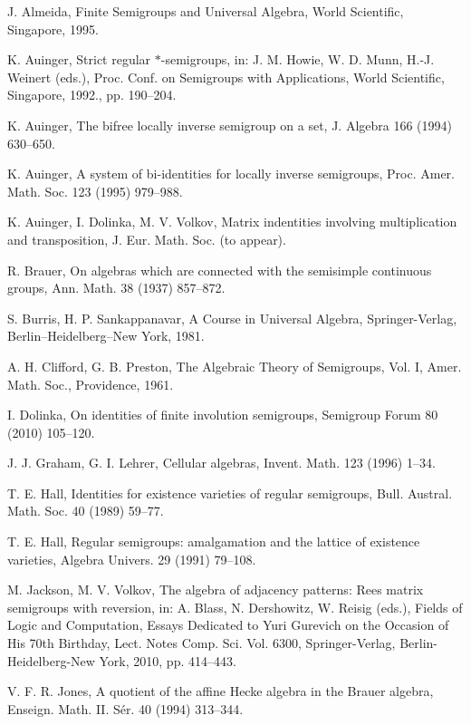 \documentclass[preprint,1p,times]{elsarticle}
\numberwithin{equation}{section}
\theoremstyle{remark}
\begin{document}
\begin{thebibliography}{99}
\frenchspacing

J. Almeida, Finite Semigroups and Universal Algebra, World Scientific, Singapore, 1995.

K. Auinger, Strict regular $*$-semigroups, in: J. M. Howie, W. D. Munn, H.-J. Weinert (eds.), Proc. Conf. on Semigroups
with Applications, World Scientific, Singapore, 1992., pp. 190--204.

K. Auinger, The bifree locally inverse semigroup on a set, J. Algebra 166 (1994) 630--650.

K. Auinger, A system of bi-identities for locally inverse semigroups, Proc. Amer. Math. Soc. 123 (1995) 979--988.

K. Auinger, I. Dolinka, M. V. Volkov, Matrix indentities involving multiplication and transposition, J. Eur. Math. Soc.
(to appear).

R. Brauer, On algebras which are connected with the semisimple continuous groups, Ann. Math. 38 (1937) 857--872.

S. Burris, H. P. Sankappanavar, A Course in Universal Algebra, Springer-Verlag, Berlin--Heidelberg--New York, 1981.

A. H. Clifford, G. B. Preston, The Algebraic Theory of Semigroups, Vol. I, Amer. Math. Soc., Providence, 1961.

I. Dolinka, On identities of finite involution semigroups, Semigroup Forum 80 (2010) 105--120.

J. J. Graham, G. I. Lehrer, Cellular algebras, Invent. Math. 123 (1996) 1--34.

T. E. Hall, Identities for existence varieties of regular semigroups, Bull. Austral. Math. Soc. 40 (1989) 59--77.

T. E. Hall, Regular semigroups: amalgamation and the lattice of existence varieties, Algebra Univers. 29 (1991)
79--108.

M. Jackson, M. V. Volkov, The algebra of adjacency patterns: Rees matrix semigroups with reversion, in: A. Blass, N.
Dershowitz, W. Reisig (eds.), Fields of Logic and Computation, Essays Dedicated to Yuri Gurevich on the Occasion of His
70th Birthday, Lect. Notes Comp. Sci. Vol. 6300, Springer-Verlag, Berlin-Heidelberg-New York, 2010, pp. 414--443.

V. F. R. Jones, A quotient of the affine Hecke algebra in the Brauer algebra, Enseign. Math. II. S\'er. 40 (1994)
313--344.


\end{thebibliography}
\end{document}
